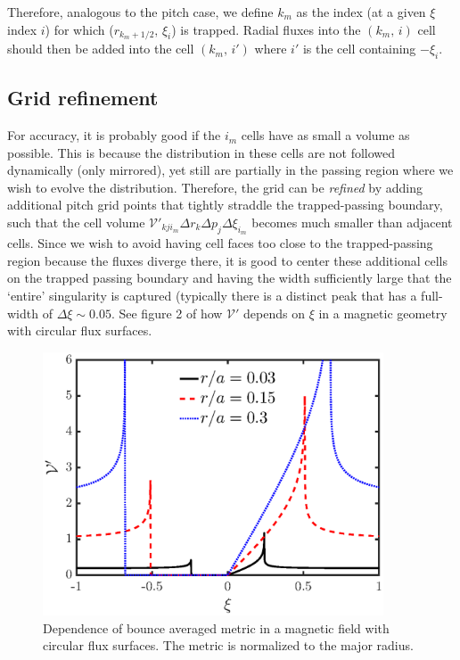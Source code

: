 \documentclass[11pt,a4paper]{article}
\begin{document}
Therefore, analogous to the pitch case, we define $k_m$ as the index (at a given $\xi$ index $i$) for which ($r_{k_m+1/2},\,\xi_i$) is trapped. Radial fluxes into the $(k_m,\,i)$ cell should then be added into the cell $(k_m,\,i')$ where $i'$ is the cell containing $-\xi_i$.

\subsection*{Grid refinement}
For accuracy, it is probably good if the $i_m$ cells have as small a volume as possible. This is because the distribution in these cells are not followed dynamically (only mirrored), yet still are partially in the passing region where we wish to evolve the distribution. Therefore, the grid can be \emph{refined} by adding additional pitch grid points that tightly straddle the trapped-passing boundary, such that the cell volume $\mathcal{V}'_{kji_m} \Delta r_k \Delta p_j \Delta \xi_{i_m}$ becomes much smaller than adjacent cells.  Since we wish to avoid having cell faces too close to the trapped-passing region because the fluxes diverge there, it is good to center these additional cells on the trapped passing boundary and having the width sufficiently large that the `entire' singularity is captured (typically there is a distinct peak that has a full-width of $\Delta \xi \sim 0.05$. See figure 2 of how $\mathcal{V}'$ depends on $\xi$ in a magnetic geometry with circular flux surfaces. 


\begin{figure}[H]
\begin{center}
\includegraphics[width=0.90\textwidth,trim=0 0 0 0]{trappedbc_VpPlot}
\caption{Dependence of bounce averaged metric in a magnetic field with circular flux surfaces. The metric is normalized to the major radius.}
\end{center}
\end{figure}
\end{document}
